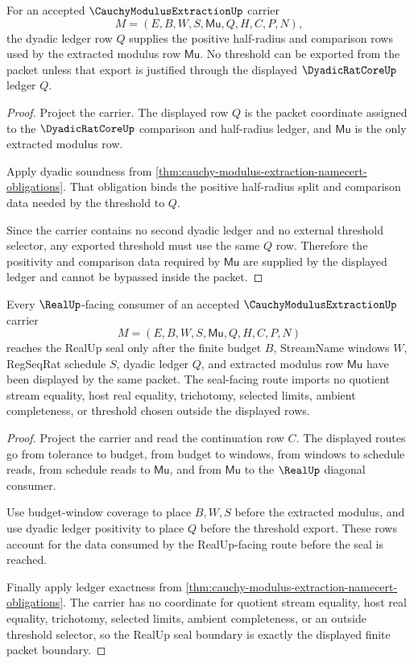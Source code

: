 \begin{theorem}
\label{thm:cauchy-modulus-extraction-dyadic-ledger-positivity}
For an accepted $\CauchyModulusExtractionUp$ carrier
$$
M=(E,B,W,S,\mathsf{Mu},Q,H,C,P,N),
$$
the dyadic ledger row $Q$ supplies the positive half-radius and comparison rows used by the extracted modulus row $\mathsf{Mu}$. No threshold can be exported from the packet unless that export is justified through the displayed $\DyadicRatCoreUp$ ledger $Q$.
\end{theorem}
\begin{proof}
Project the carrier. The displayed row $Q$ is the packet coordinate assigned to the $\DyadicRatCoreUp$ comparison and half-radius ledger, and $\mathsf{Mu}$ is the only extracted modulus row.

Apply dyadic soundness from \autoref{thm:cauchy-modulus-extraction-namecert-obligations}. That obligation binds the positive half-radius split and comparison data needed by the threshold to $Q$.

Since the carrier contains no second dyadic ledger and no external threshold selector, any exported threshold must use the same $Q$ row. Therefore the positivity and comparison data required by $\mathsf{Mu}$ are supplied by the displayed ledger and cannot be bypassed inside the packet.
\end{proof}

\begin{theorem}
\label{thm:cauchy-modulus-extraction-real-seal-boundary}
Every $\RealUp$-facing consumer of an accepted $\CauchyModulusExtractionUp$ carrier
$$
M=(E,B,W,S,\mathsf{Mu},Q,H,C,P,N)
$$
reaches the RealUp seal only after the finite budget $B$, StreamName windows $W$, RegSeqRat schedule $S$, dyadic ledger $Q$, and extracted modulus row $\mathsf{Mu}$ have been displayed by the same packet. The seal-facing route imports no quotient stream equality, host real equality, trichotomy, selected limits, ambient completeness, or threshold chosen outside the displayed rows.
\end{theorem}
\begin{proof}
Project the carrier and read the continuation row $C$. The displayed routes go from tolerance to budget, from budget to windows, from windows to schedule reads, from schedule reads to $\mathsf{Mu}$, and from $\mathsf{Mu}$ to the $\RealUp$ diagonal consumer.

Use budget-window coverage to place $B,W,S$ before the extracted modulus, and use dyadic ledger positivity to place $Q$ before the threshold export. These rows account for the data consumed by the RealUp-facing route before the seal is reached.

Finally apply ledger exactness from \autoref{thm:cauchy-modulus-extraction-namecert-obligations}. The carrier has no coordinate for quotient stream equality, host real equality, trichotomy, selected limits, ambient completeness, or an outside threshold selector, so the RealUp seal boundary is exactly the displayed finite packet boundary.
\end{proof}

